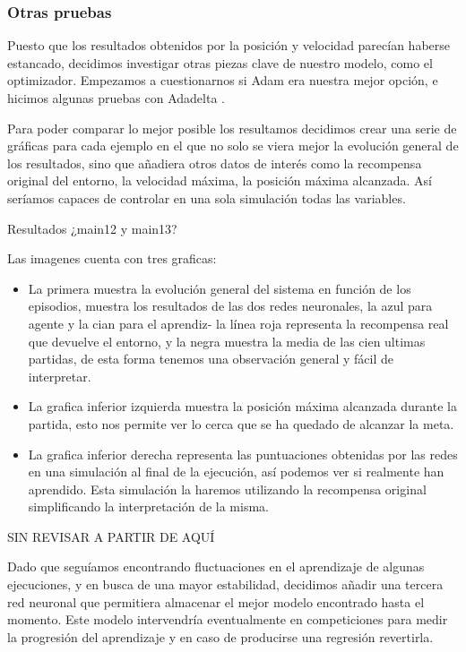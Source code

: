 \subsubsection*{Otras pruebas}

Puesto que los resultados obtenidos por la posición y velocidad parecían haberse estancado, decidimos investigar otras piezas clave de nuestro modelo, como el optimizador. Empezamos a cuestionarnos si Adam \citep{kingma2014adam} era nuestra mejor opción, e hicimos algunas pruebas con Adadelta \citep{NIPS2017_7003}.

Para poder comparar lo mejor posible los resultamos decidimos crear una serie de gráficas para cada ejemplo en el que no solo se viera mejor la evolución general de los resultados, sino que añadiera otros datos de interés como la recompensa original del entorno, la velocidad máxima, la posición máxima alcanzada. Así seríamos capaces de controlar en una sola simulación todas las variables.

%
       {Resultados ¿main12 y main13?}

Las imagenes cuenta con tres graficas:
\begin{itemize}
    \item La primera muestra la evolución general del sistema en función de los episodios, muestra los resultados de las dos redes neuronales, la azul para agente y la cian para el aprendiz- la línea roja representa la recompensa real que devuelve el entorno, y la negra muestra la media de las cien ultimas partidas, de esta forma tenemos una observación general y fácil de interpretar.
    \item La grafica inferior izquierda muestra la posición máxima alcanzada durante la partida, esto nos permite ver lo cerca que se ha quedado de alcanzar la meta.
    \item La grafica inferior derecha representa las puntuaciones obtenidas por las redes en una simulación al final de la ejecución, así podemos ver si realmente han aprendido. Esta simulación la haremos utilizando la recompensa original simplificando la interpretación de la misma.  
\end{itemize}
 
SIN REVISAR A PARTIR DE AQUÍ

Dado que seguíamos encontrando fluctuaciones en el aprendizaje de algunas ejecuciones, y en busca de una mayor estabilidad, decidimos añadir una tercera red neuronal que permitiera almacenar el mejor modelo encontrado hasta el momento. Este modelo intervendría eventualmente en competiciones para medir la progresión del aprendizaje y en caso de producirse una regresión revertirla.

